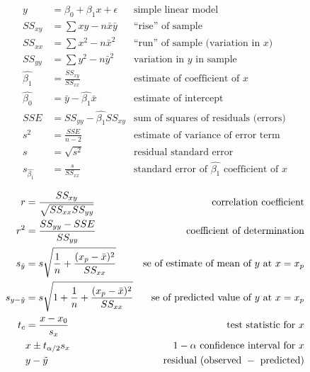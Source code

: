 \documentclass[12pt, landscape]{article}
\begin{document}
\begin{multicols}{2}
\setlength{\abovedisplayskip}{0pt}
\setlength{\belowdisplayskip}{0pt}
\setlength{\abovedisplayshortskip}{0pt}
\setlength{\belowdisplayshortskip}{0pt}
\begin{align*}
    y &= \beta_0 + \beta_1 x + \epsilon &\text{simple linear model} \\
    SS_{xy} &= \sum{xy} - n \bar{x} \bar{y} &\text{“rise” of sample}\\
    SS_{xx} &= \sum{x^2} - n \bar{x}^2 &\text{“run” of sample (variation in }x\text{)} \\
    SS_{yy} &= \sum{y^2} - n \bar{y}^2 &\text{variation in }y\text{ in sample} \\
    \hat{\beta_1} &= \frac{SS_{xy}}{SS_{xx}}&\text{estimate of coefficient of }x \\
    \hat{\beta_0} &= \bar{y} - \hat{\beta_1} \bar{x} &\text{estimate of intercept} \\
    SSE &= SS_{yy} - \hat{\beta_1} SS_{xy} &\text{sum of squares of residuals (errors)}\\
    s^2 &= \frac{SSE}{n-2} & \text{estimate of variance of error term}\\
    s &= \sqrt{s^2} &\text{residual standard error} \\
    s_{\hat{\beta_1}} &= \frac{s}{SS_{xx}} &\text{standard error of } \hat{\beta_1} \text{ coefficient of }x
\end{align*}

\vfill\null
\columnbreak

\begin{align*}
    r &= \frac{SS_{xy}}{\sqrt{SS_{xx} SS_{yy}}} & \text{correlation coefficient}\\
    r^2 &= \frac{SS_{yy} - SSE}{SS_{yy}} & \text{coefficient of determination}\\
    s_{\hat{y}} &= s \sqrt{\frac{1}{n} + \frac{(x_p - \bar{x})^2}{SS_{xx}}} & \text{se of estimate of mean of } y \text{ at } x = x_p\\
    s_{y-\hat{y}} &= s \sqrt{1 + \frac{1}{n} + \frac{(x_p - \bar{x})^2}{SS_{xx}}} & \text{se of predicted value of } y \text{ at } x = x_p\\
    t_c &= \frac{x - x_0}{s_x} & \text{test statistic for } x\\
    &x \pm t_{\alpha / 2} s_x & 1-\alpha \text{ confidence interval for } x\\
    &y-\Tilde{y} & \text{residual (observed } - \text{ predicted)}
\end{align*}

\end{multicols}
\end{document}
